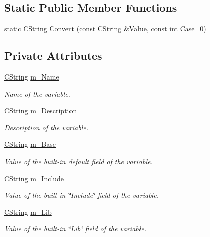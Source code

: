 \subsection*{Static Public Member Functions}
\begin{DoxyCompactItemize}
\item 
static \hyperlink{classCString}{C\-String} \hyperlink{classCGlobalVariable_a1a19ed995e8d12071334da52ae47bbba}{Convert} (const \hyperlink{classCString}{C\-String} \&Value, const int Case=0)
\end{DoxyCompactItemize}
\subsection*{Private Attributes}
\begin{DoxyCompactItemize}
\item 
\hyperlink{classCString}{C\-String} \hyperlink{classCGlobalVariable_ae2e71db4b7f7a5c0dec2c97cf6186fc9}{m\-\_\-\-Name}
\begin{DoxyCompactList}\small\item\em Name of the variable. \end{DoxyCompactList}\item 
\hyperlink{classCString}{C\-String} \hyperlink{classCGlobalVariable_a5fcfab7b98ac6eac8ef6fcabe29e57c9}{m\-\_\-\-Description}
\begin{DoxyCompactList}\small\item\em Description of the variable. \end{DoxyCompactList}\item 
\hyperlink{classCString}{C\-String} \hyperlink{classCGlobalVariable_a5b9003628abc6731b802f8991e5d8e0f}{m\-\_\-\-Base}
\begin{DoxyCompactList}\small\item\em Value of the built-\/in default field of the variable. \end{DoxyCompactList}\item 
\hyperlink{classCString}{C\-String} \hyperlink{classCGlobalVariable_a31bf0d3eb6a89b83810c14014da3da4b}{m\-\_\-\-Include}
\begin{DoxyCompactList}\small\item\em Value of the built-\/in \char`\"{}\-Include\char`\"{} field of the variable. \end{DoxyCompactList}\item 
\hyperlink{classCString}{C\-String} \hyperlink{classCGlobalVariable_acea43fe8f3fb15c77a8853259acb713e}{m\-\_\-\-Lib}
\begin{DoxyCompactList}\small\item\em Value of the built-\/in \char`\"{}\-Lib\char`\"{} field of the variable. \end{DoxyCompactList}\item 

\end{DoxyCompactItemize}
